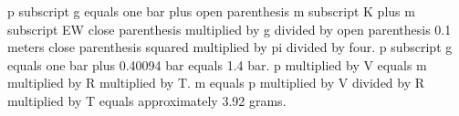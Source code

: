p subscript g equals one bar plus open parenthesis m subscript K plus m subscript EW close parenthesis multiplied by g divided by open parenthesis 0.1 meters close parenthesis squared multiplied by pi divided by four.  
p subscript g equals one bar plus 0.40094 bar equals 1.4 bar.  
p multiplied by V equals m multiplied by R multiplied by T.  
m equals p multiplied by V divided by R multiplied by T equals approximately 3.92 grams.